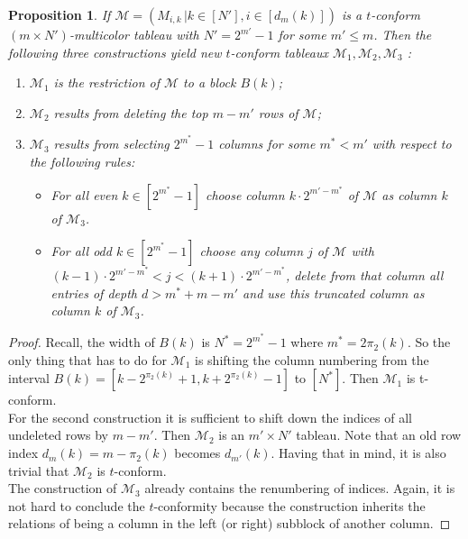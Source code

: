 \documentclass[a4paper,USenglish,numberwithinsect]{lipics}
\theoremstyle{plain}
\newtheorem{proposition}[theorem]{Proposition}
\begin{document}
\begin{proposition} \label{TabConstr}
If ${\mathcal M}=\left(M_{i,k} \, | k\in [N'] ,  i\in [d_m(k)] \right)$
is a $t$-conform  $(m \times N')$-multicolor tableau with $N'=2^{m'}-1$ for some $m'\leq m$. Then the following three constructions
yield new   $t$-conform tableaux  ${\mathcal M}_1,{\mathcal M}_2,{\mathcal M}_3$ :
\begin{enumerate}
\item ${\mathcal M}_1$ is the restriction of ${\mathcal M}$ to a block
$B(k)$;
\item  ${\mathcal M}_2$ results from  deleting  the top $m-m'$ rows
of  ${\mathcal M}$;
\item ${\mathcal M}_3$ results from  selecting  $2^{m^*}-1$ columns
for some $m^*<m'$
with respect to the following rules:
\begin{itemize}
\item For all even $k \in [2^{m^*}-1]$ choose column $k\cdot 2^{m'-m^*}$
of ${\mathcal M}$ as
column $k$ of ${\mathcal M}_3$.
\item For all odd $k \in [2^{m^*}-1]$ choose any column  $j$   of
${\mathcal M}$ with
$(k-1) \cdot 2^{m'-m^*} < j < (k+1) \cdot 2^{m'-m^*} $, delete from that
column all entries
of depth $d> m^*+m-m'$ and use this truncated column as column $k$ of
${\mathcal M}_3$.
\end{itemize}
\end{enumerate}
\end{proposition}
\begin{proof}
Recall, the width of $B(k)$ is  $N^*=2^{m^*}-1$ where  
$m^*= 2\pi_2(k)$.
So the only thing that has to do  for ${\mathcal M}_1$ is  shifting  the column
numbering
from the interval $B(k)=[k-2^{\pi_2(k)}+1, k+2^{\pi_2(k)}-1]$ to
$[N^*]$. Then  ${\mathcal M}_1$ is t-conform.
\\
For the second construction it is sufficient to shift down the indices
of all undeleted
rows by $m-m'$. Then ${\mathcal M}_2$ is an $m'\times N'$ tableau. Note
that an old row index
$d_m(k)=m - \pi_2(k)$ becomes $d_{m'}(k)$. Having that in mind, it
is also trivial
that  ${\mathcal M}_2$ is $t$-conform.
\\
The construction of ${\mathcal M}_3$ already contains the renumbering of
indices.  Again, it
is not hard to conclude the $t$-conformity because the construction
inherits the relations
of being a column in the left (or right) subblock of another column.
\end{proof}
\end{document}
